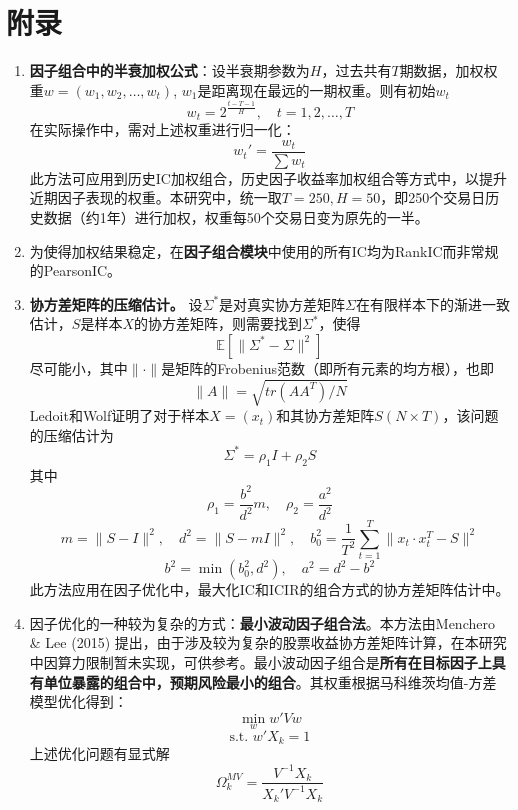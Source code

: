 \documentclass[11pt]{article}
\begin{document}
\section{附录}
\begin{enumerate}
  \item \textbf{因子组合中的半衰加权公式}：设半衰期参数为$H$，过去共有$T$期数据，加权权重$w=(w_1,w_2,\dots,w_t)$, $w_1$是距离现在最远的一期权重。则有初始$w_t$
  $$w_t=2^{\frac{t-T-1}{H}}, \quad t=1,2,\dots,T$$ 在实际操作中，需对上述权重进行归一化：
  $$w_t'=\frac{w_t}{\sum w_t}$$
  此方法可应用到历史IC加权组合，历史因子收益率加权组合等方式中，以提升近期因子表现的权重。本研究中，统一取$T=250,H=50$，即250个交易日历史数据（约1年）进行加权，权重每50个交易日变为原先的一半。
  \item 为使得加权结果稳定，在\textbf{因子组合模块}中使用的所有IC均为RankIC而非常规的PearsonIC。
  \item \textbf{协方差矩阵的压缩估计。} 设$\Sigma^*$是对真实协方差矩阵$\Sigma$在有限样本下的渐进一致估计，$S$是样本$X$的协方差矩阵，则需要找到$\Sigma^*$，使得
  $$\mathbb{E}\left[\|\Sigma^*-\Sigma\|^2\right]$$
  尽可能小，其中$\|\cdot\|$是矩阵的Frobenius范数（即所有元素的均方根），也即
  $$\|A\|=\sqrt{tr(AA^T)/N}$$
  Ledoit和Wolf证明了对于样本$X=(x_t)$和其协方差矩阵$S(N\times T)$，该问题的压缩估计为
  $$\Sigma^*=\rho_1 I+\rho_2 S$$
  其中
  $$\rho_1=\frac{b^2}{d^2}m, \quad \rho_2=\frac{a^2}{d^2}$$
  $$m=\|S-I\|^2, \quad d^2=\|S-mI\|^2, \quad b_0^2=\frac{1}{T^2}\sum_{t=1}^T \|x_t \cdot x_t^T-S\|^2$$
  $$b^2=\min(b_0^2,d^2), \quad a^2=d^2-b^2$$
  此方法应用在因子优化中，最大化IC和ICIR的组合方式的协方差矩阵估计中。
  \item 因子优化的一种较为复杂的方式：\textbf{最小波动因子组合法}。本方法由Menchero \& Lee (2015) \cite{menchero2015efficiently}提出，由于涉及较为复杂的股票收益协方差矩阵计算，在本研究中因算力限制暂未实现，可供参考。最小波动因子组合是\textbf{所有在目标因子上具有单位暴露的组合中，预期风险最小的组合}。其权重根据马科维茨均值-方差模型优化得到：
  $$\min_w w'Vw$$ $$\text{s.t. }w'X_k=1$$ 上述优化问题有显式解
  $$\Omega_k^{MV}=\frac{V^{-1}X_k}{X_k'V^{-1}X_k}$$
  

\end{enumerate}
\end{document}
